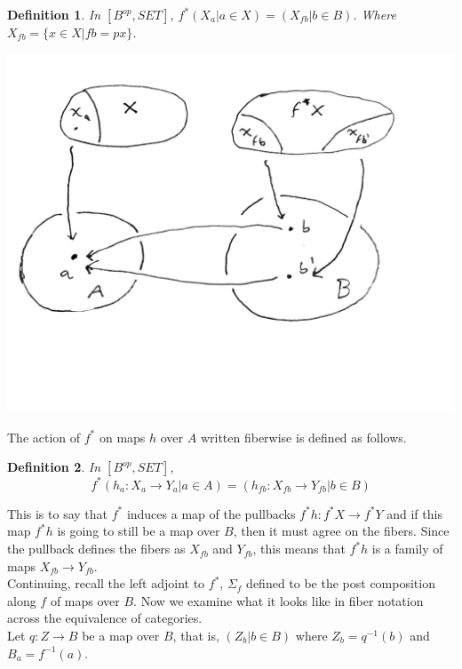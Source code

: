 \documentclass{article}
\theoremstyle{problemstyle}
\theoremstyle{problemstyle}
\newtheorem{definition}{Definition}
\theoremstyle{problemstyle}
\theoremstyle{problemstyle}
\theoremstyle{problemstyle}
\theoremstyle{problemstyle}
\theoremstyle{problemstyle}
\theoremstyle{problemstyle}
\begin{document}
\begin{definition}
In $[B^{op}, SET]$, $f^*(X_a|a\in X) = (X_{fb}|b\in B)$. Where $X_{fb} = \{x \in X | fb = px\}$. 
\end{definition}

\includegraphics[scale=.15]{Figure2_pullback}

The action of $f^*$ on maps $h$ over $A$ written fiberwise is defined as follows. 

\begin{definition}
In $[B^{op}, SET]$, $$f^*(h_a:X_a \rightarrow Y_a|a \in A) = (h_{fb}:X_{fb} \rightarrow Y_{fb}|b \in B)$$
\end{definition}

This is to say that $f^*$ induces a map of the pullbacks $f^*h:f^*X \rightarrow f^*Y$ and if this map $f^*h$ is going to still be a map over $B$, then it must agree on the fibers. Since the pullback defines the fibers as $X_{fb}$ and $Y_{fb}$, this means that $f^*h$ is a family of maps $X_{fb} \rightarrow Y_{fb}$.\\

Continuing, recall the left adjoint to $f^*$, $\Sigma_f$ defined to be the post composition along $f$ of maps over $B$. Now we examine what it looks like in fiber notation across the equivalence of categories.\\ 

Let $q:Z \rightarrow B$ be a map over $B$, that is, $(Z_b |b \in B)$ where $Z_b = q^{-1}(b)$ and $B_a = f^{-1}(a)$. 

\begin{center}
\end{center}
\end{document}
